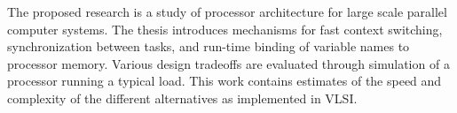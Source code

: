 %
%
%
The proposed research
is a study of processor architecture for
large scale parallel computer systems.
The thesis introduces mechanisms
for fast context switching,
synchronization between tasks,
and run-time binding of
variable names to processor memory.
Various design tradeoffs are evaluated
through simulation of a processor running a typical load.
This work contains
estimates of
the speed and complexity of the different
alternatives as implemented in  VLSI.
